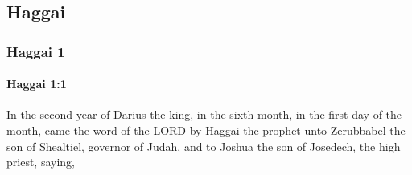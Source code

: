 \subsection{Haggai}
	\label{HAGGAI}

	\subsubsection{Haggai 1} %
		\label{HAGGAI-1}

		\paragraph{Haggai 1:1} %
			\label{HAGGAI-1-1}

			In the second year of Darius the king, in the sixth month, in the first day of the month, came the word of the LORD by Haggai the prophet unto Zerubbabel the son of Shealtiel, governor of Judah, and to Joshua the son of Josedech, the high priest, saying,

